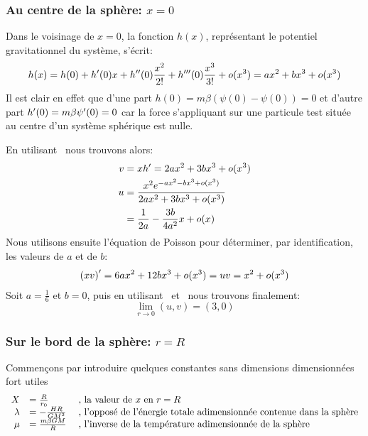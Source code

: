 
\subsubsection{Au centre de la sphère: $x = 0$}
	Dans le voisinage de $x=0$, la fonction $h(x)$, représentant le potentiel gravitationnel du système, s'écrit:
	\begin{align*}
		h(x) = h(0) + h'(0)x + h^{\prime\prime}(0)\frac{x^2}{2!} + h^{\prime\prime\prime}(0)\frac{x^3}{3!} + o(x^3) = ax^2 + bx^3 + o(x^3)
	\end{align*}
	Il est clair en effet que d'une part \mbox{$h(0) = m\beta\left(\psi(0) - \psi(0)\right) = 0$} et d'autre part \mbox{$h'(0) = m\beta\psi'(0) = 0$} car la force s'appliquant sur une particule test située au centre d'un système sphérique est nulle.

	En utilisant~ nous trouvons alors:
	\begin{align}
		v &= xh' = 2ax^2 + 3bx^3 + o(x^3)\label{vDL} \\
		u &= \frac{x^2e^{-ax^2 - bx^3 + o(x^3)}}{2ax^2 + 3bx^3 + o(x^3)} \\
		  &= \frac{1}{2a} - \frac{3b}{4a^2}x + o(x)\label{uDL}
	\end{align}
	Nous utilisons ensuite l'équation de Poisson pour déterminer, par identification, les valeurs de $a$ et de $b$:
	\begin{align}
		\left(xv\right)' = 6ax^2 + 12bx^3 + o(x^3) = uv = x^2 + o(x^3)\label{PoisDL}
	\end{align}
	Soit $a = \frac{1}{6}$ et $b=0$, puis en utilisant~ et~ nous trouvons finalement:
	$$\lim_{r\to 0}(u,v) = (3,0)$$

\subsubsection{Sur le bord de la sphère: $r = R$}
	Commençons par introduire quelques constantes sans dimensions dimensionnées fort utiles 
	\begin{align}
		\begin{array}{rll}
		X &= \frac{R}{r_0}\;   &\textrm{, la valeur de }x\textrm{ en }r=R \\
		\lambda &= - \frac{H R}{G M^2}\;   &\textrm{, l'opposé de l'énergie totale adimensionnée contenue dans la sphère}\\
		\mu &= \frac{m\beta GM}{R}\;    &\textrm{, l'inverse de la température adimensionnée de la sphère}
		\end{array} \notag
	\end{align}
	
